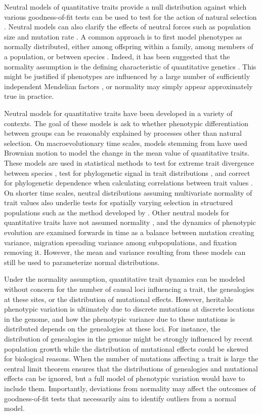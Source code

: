 Neutral models of quantitative traits provide a null distribution against which
various goodness-of-fit tests can be used to test for the action of natural
selection \citep{Lande1976,Leinonen2013}. Neutral models can also clarify the
effects of neutral forces such as population size and mutation
rate \citep{Lynch1986}. A common approach is to first model phenotypes as
normally distributed, either among offspring within a family, among members of a
population, or between species \citep{Turelli2017}. Indeed, it has been
suggested that the normality assumption is the defining characteristic of
quantitative genetics \citep{Rice2004}. This might be justified if phenotypes
are influenced by a large number of sufficiently independent Mendelian
factors \citep{Fisher1918}, or normality may simply appear approximately true in
practice.

Neutral models for quantitative traits have been developed in a variety of
contexts. The goal of these models is ask to whether phenotypic differentiation
between groups can be reasonably explained by processes other than natural
selection. On macroevolutionary time scales, models stemming
from \citet{Lande1976} have used Brownian motion to model the change in the mean
value of quantitative traits. These models are used in statistical methods to
test for extreme trait divergence between species \citep{Turelli1988}, test for
phylogenetic signal in trait distributions \citep{Freckleton2002}, and correct
for phylogenetic dependence when calculating correlations between trait
values \citep{Felsenstein1985}. On shorter time scales, neutral distributions
assuming multivariate normality of trait values also underlie tests for
spatially varying selection in structured populations such as the method
developed by \citet{Ovaskainen2011}. Other neutral models for quantitative
traits have not assumed normality \citep{Chakraborty1982,Lynch1986,Lande1992},
and the dynamics of phenotypic evolution are examined forwards in time as a
balance between mutation creating variance, migration spreading variance among
subpopulations, and fixation removing it. However, the mean and variance
resulting from these models can still be used to parameterize normal
distributions.

Under the normality assumption, quantitative trait dynamics can be modeled
without concern for the number of causal loci influencing a trait, the
genealogies at these sites, or the distribution of mutational effects. However,
heritable phenotypic variation is ultimately due to discrete mutations at
discrete locations in the genome, and how the phenotypic variance due to these
mutations is distributed depends on the genealogies at these loci. For instance,
the distribution of genealogies in the genome might be strongly influenced by
recent population growth while the distribution of mutational effects could be
skewed for biological reasons. When the number of mutations affecting a trait is
large the central limit theorem ensures that the distributions of genealogies
and mutational effects can be ignored, but a full model of phenotypic variation
would have to include them. Importantly, deviations from normality may affect
the outcomes of goodness-of-fit tests that necessarily aim to identify outliers
from a normal model.

